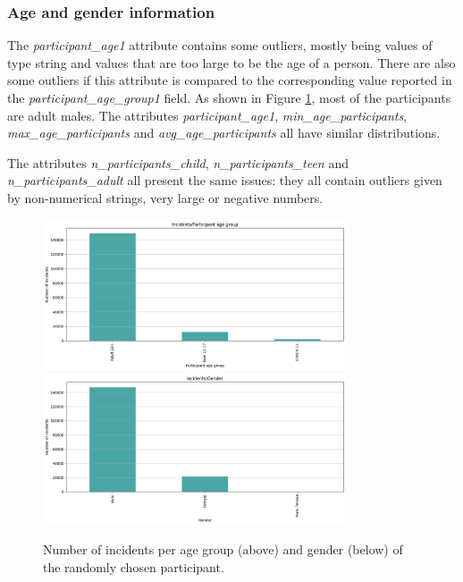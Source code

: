 \documentclass[10pt,a4paper]{report}
\begin{document}
\subsubsection{Age and gender information}

The \textit{participant\_age1} attribute contains some outliers, mostly being values of type string and values that are too large to be the age of a person.
There are also some outliers if this attribute is compared to the corresponding value reported in the \textit{participant\_age\_group1} field.
As shown in Figure \ref{incidents_per_agegender}, most of the participants are adult males.
The attributes \textit{participant\_age1}, \textit{min\_age\_participants}, \textit{max\_age\_participants} and \textit{avg\_age\_participants} all have similar distributions.

The attributes \textit{n\_participants\_child}, \textit{n\_participants\_teen} and \textit{n\_participants\_adult} all present the same issues: they all contain outliers given by non-numerical strings, very large or negative numbers.

\begin{figure}[H]
	\includegraphics[width=0.8\textwidth]{incidents_per_agegroup}
	\centering
	\includegraphics[width=0.8\textwidth]{incidents_per_gender}
	\caption{Number of incidents per age group (above) and gender (below) of the randomly chosen participant.}
	\label{incidents_per_agegender}
\end{figure}
\end{document}
